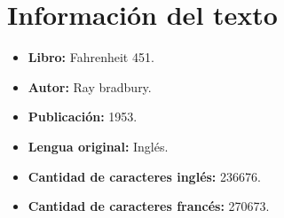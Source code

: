 \documentclass[12pt,letterpaper]{article}
\begin{document}
\newpage

\newpage
\section{Información del texto}
\begin{itemize}
    \item \textbf{Libro: }Fahrenheit 451.
    \item \textbf{Autor: }Ray bradbury.
    \item \textbf{Publicación: }1953.
    \item \textbf{Lengua original: }Inglés.
    \item \textbf{Cantidad de caracteres inglés: }236676.
    \item \textbf{Cantidad de caracteres francés: }270673.
\end{itemize}
\end{document}
